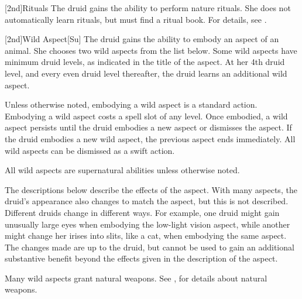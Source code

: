[2nd]{Rituals}
The druid gains the ability to perform nature rituals.
She does not automatically learn rituals, but must find a ritual book.
For details, see .

[2nd]{Wild Aspect}[Su]
The druid gains the ability to embody an aspect of an animal.
She chooses two wild aspects from the list below.
Some wild aspects have minimum druid levels, as indicated in the title of the aspect.
At her 4th druid level, and every even druid level thereafter, the druid learns an additional wild aspect.

Unless otherwise noted, embodying a wild aspect is a standard action.
Embodying a wild aspect costs a spell slot of any level.
Once embodied, a wild aspect persists until the druid embodies a new aspect or dismisses the aspect.
If the druid embodies a new wild aspect, the previous aspect ends immediately.
All wild aspects can be dismissed as a swift action.

All wild aspects are supernatural abilities unless otherwise noted.

The descriptions below describe the effects of the aspect.
With many aspects, the druid's appearance also changes to match the aspect, but this is not described.
Different druids change in different ways.
For example, one druid might gain unusually large eyes when embodying the low-light vision aspect, while another might change her irises into slits, like a cat, when embodying the same aspect.
The changes made are up to the druid, but cannot be used to gain an additional substantive benefit beyond the effects given in the description of the aspect.

Many wild aspects grant natural weapons.
See , for details about natural weapons.


